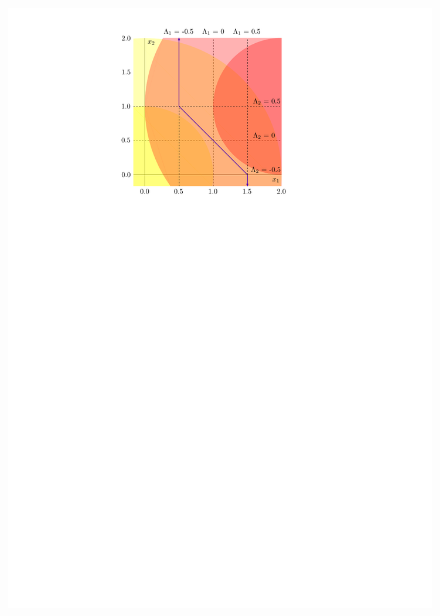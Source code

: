 \begin{figure}[ht]
\begin{minipage}[t]{0.44\linewidth}
    \includegraphics[width=1\textwidth]{gauss_quant_rule}
  \end{minipage}
\end{figure}



